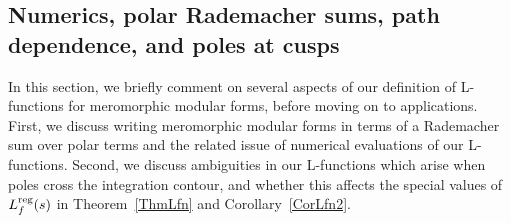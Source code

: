 \documentclass[11pt,a4paper]{article}
\newcommand{\reg}{{\rm reg}}
\begin{document}
\subsection{Numerics, polar Rademacher sums, path dependence, and poles at cusps}\label{sec15-HR1919}

In this section, we briefly comment on several aspects of our definition of L-functions for meromorphic modular forms, before moving on to applications. First, we discuss writing meromorphic modular forms in terms of a Rademacher sum over polar terms and the related issue of numerical evaluations of our L-functions. Second, we discuss ambiguities in our L-functions which arise when poles cross the integration contour, and whether this affects the special values of $L_f^\reg(s)$ in Theorem~\ref{ThmLfn} and Corollary~\ref{CorLfn2}.
\end{document}
